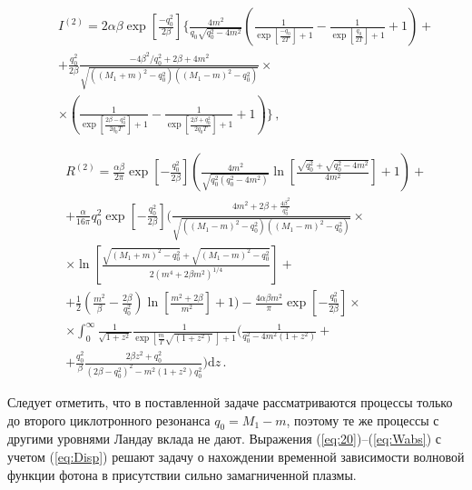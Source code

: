 \documentclass[14pt, russian]{article}
\newcommand{\dd}{\mathrm{d}} %
\begin{document}
\begin{eqnarray}
		\nonumber
		&&I^{(2)}=2\alpha\beta\exp\left[{\frac{-q^2_0}{2\beta}}\right] \bigg\{
		\frac{4 m^2}{q_0\sqrt{q^{2}_{0}-4 m^2}}
	  \left(\frac{1}{\exp\left[\frac{-q_0}{2  T}\right]+1}-\frac{1}{\exp\left[\frac{q_0}{2T}\right]+1}+1\right) +
		\\
		\nonumber
		&&+
		\frac{q_0^2}{2\beta}
		\frac{-4\beta^2/q^{2}_{0} + 2 \beta + 4 m^2}{\sqrt{((M_1+m)^2-q_0^2)((M_1-m)^2-q_0^2)}}\times
		\\
		&&\times\left(\frac{1}{\exp\left[\frac{2\beta -q_0^2}{2 q_0 T}\right]+1}-\frac{1}{\exp\left[\frac{2\beta +q_0^2}{2 q_0 T}\right]+1}+1\right)
		\bigg\}\, ,
\end{eqnarray}

\begin{eqnarray}
\nonumber
		&&R^{(2)}= \frac{\alpha\beta}{2\pi}\exp\left[-\frac{q_0^2}{2\beta}\right]\left(\frac{4m^2}{\sqrt{q_0^2(q_0^2-4m^2)}}\ln\left[\frac{\sqrt{q_0^2}+\sqrt{q_0^2-4m^2}}{4m^2}\right]+1\right)+ 
		\\
		\nonumber
		&&+\frac{\alpha}{16\pi}q^2_0 \exp\left[-\frac{q_0^2}{2\beta}\right] \bigg( \frac{4m^2+2\beta+\frac{4\beta^2}{ q_0^2}}{\sqrt{((M_1-m)^2-q^2_0)((M_1-m)^2-q^2_0)}}
		\times
		\\
		\nonumber
		&&\times
		\ln\left[\frac{\sqrt{(M_1+m)^2-q_0^2}+\sqrt{(M_1-m)^2-q_0^2}}{2(m^4+2\beta m^2)^{1/4}}\right]+
		\\
		\nonumber
		&&+\frac{1}{2}\left(\frac{m^2}{\beta}-\frac{2\beta}{q_0^2}\right)\ln\left[\frac{m^2+2\beta}{m^2}\right]+1\bigg)- \frac{4\alpha\beta m^2}{\pi}\exp\left[-\frac{q_0^2}{2\beta}\right]\times
		\\
		\nonumber
		&&\times
		\int_{0}^{\infty}\frac{1}{\sqrt{1+z^2}}\frac{1}{\exp[\frac{m}{T}\sqrt{(1+z^2)}\,]+1}\bigg(\frac{1}{q_0^2-4m^2(1+z^2)}+
		\\
		&&+\frac{q_0^2}{\beta}\frac{2\beta z^2 + q_0^2}{(2\beta - q_0^2)^2-m^2(1+z^2)q_0^2}\bigg)\dd z\, .
\end{eqnarray}

Следует отметить, что в поставленной задаче рассматриваются процессы только до второго циклотронного резонанса $q_0=M_1-m$, поэтому те же процессы с другими уровнями Ландау вклада не дают.
Выражения (\ref{eq:20})--(\ref{eq:Wabs}) с учетом (\ref{eq:Disp}) решают задачу 
о нахождении временной зависимости волновой функции фотона  в присутствии сильно 
замагниченной плазмы. 
\end{document}
